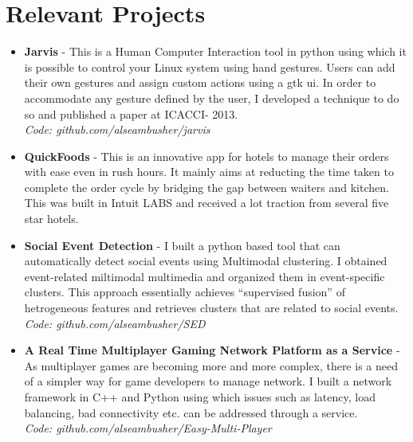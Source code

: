 \documentclass[a4paper]{article} %
\begin{document}
\section{Relevant Projects}
\begin{itemize}
 \item \textbf{Jarvis} - This is a Human Computer Interaction tool in python using which it is possible to control your Linux system using hand gestures. Users can add their own gestures and assign custom actions using a gtk ui. In order to accommodate any gesture defined by the user, I developed a technique to do so and published a paper at ICACCI- 2013. \\
 \textit{Code: github.com/alseambusher/jarvis}
 \item \textbf{QuickFoods} - This is an innovative app for hotels to manage their orders with ease even in rush hours. It mainly aims at reducting the time taken to complete the order cycle by bridging the gap between waiters and kitchen. This was built in Intuit LABS and received a lot traction from several five star hotels.
 \item \textbf{Social Event Detection} - I built a python based tool that can automatically detect social events using Multimodal clustering. I obtained event-related miltimodal multimedia and organized them in event-specific clusters. This approach essentially achieves “supervised fusion” of hetrogeneous features and retrieves clusters that are related to social events.\\
 \textit{Code: github.com/alseambusher/SED}
 \item \textbf{A Real Time Multiplayer Gaming Network Platform as a Service} - As multiplayer games are becoming more and more complex, there is a need of a simpler way for game developers to manage network. I built a network framework in C++ and Python using which issues such as latency, load balancing, bad connectivity etc. can be addressed through a service.\\
 \textit{Code: github.com/alseambusher/Easy-Multi-Player}
\end{itemize}

\end{document}
